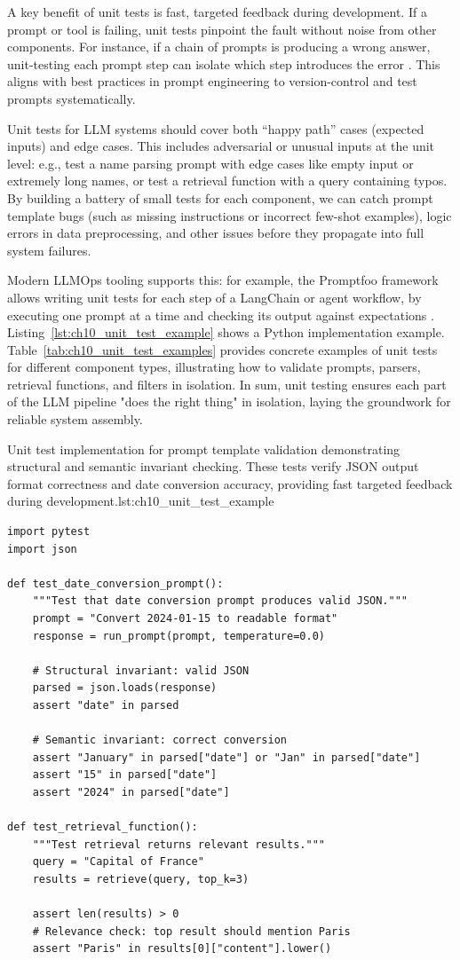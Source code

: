 A key benefit of unit tests is fast, targeted feedback during development. If a prompt or tool is failing, unit tests pinpoint the fault without noise from other components. For instance, if a chain of prompts is producing a wrong answer, unit-testing each prompt step can isolate which step introduces the error \cite{promptfoo}. This aligns with best practices in prompt engineering to version-control and test prompts systematically.  

Unit tests for LLM systems should cover both “happy path” cases (expected inputs) and edge cases. This includes adversarial or unusual inputs at the unit level: e.g., test a name parsing prompt with edge cases like empty input or extremely long names, or test a retrieval function with a query containing typos. By building a battery of small tests for each component, we can catch prompt template bugs (such as missing instructions or incorrect few-shot examples), logic errors in data preprocessing, and other issues before they propagate into full system failures.  

Modern LLMOps tooling supports this: for example, the Promptfoo framework allows writing unit tests for each step of a LangChain or agent workflow, by executing one prompt at a time and checking its output against expectations \cite{promptfoo}. Listing~\ref{lst:ch10_unit_test_example} shows a Python implementation example. Table~\ref{tab:ch10_unit_test_examples} provides concrete examples of unit tests for different component types, illustrating how to validate prompts, parsers, retrieval functions, and filters in isolation. In sum, unit testing ensures each part of the LLM pipeline "does the right thing" in isolation, laying the groundwork for reliable system assembly.

\begin{codebox}{Unit test implementation for prompt template validation demonstrating structural and semantic invariant checking. These tests verify JSON output format correctness and date conversion accuracy, providing fast targeted feedback during development.}{lst:ch10_unit_test_example}
\begin{verbatim}
import pytest
import json

def test_date_conversion_prompt():
    """Test that date conversion prompt produces valid JSON."""
    prompt = "Convert 2024-01-15 to readable format"
    response = run_prompt(prompt, temperature=0.0)

    # Structural invariant: valid JSON
    parsed = json.loads(response)
    assert "date" in parsed

    # Semantic invariant: correct conversion
    assert "January" in parsed["date"] or "Jan" in parsed["date"]
    assert "15" in parsed["date"]
    assert "2024" in parsed["date"]

def test_retrieval_function():
    """Test retrieval returns relevant results."""
    query = "Capital of France"
    results = retrieve(query, top_k=3)

    assert len(results) > 0
    # Relevance check: top result should mention Paris
    assert "Paris" in results[0]["content"].lower()
\end{verbatim}
\end{codebox}

